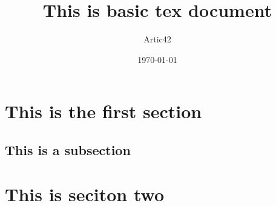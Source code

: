 \def\MYTITLE{This is basic tex document}
\def\MYNAME{Artic42}






    \title{\MYTITLE}
    \author{\MYNAME}
    \date{\today}
    \maketitle

    \thispagestyle{firstPage}
    \begin{abstract}
    \lipsum[10]
    \end{abstract}

    \section{This is the first section}
    \lipsum[1]
        \subsection{This is a subsection}
        \lipsum[5-6]
    \section{This is seciton two}
    \lipsum[8-10]
    
